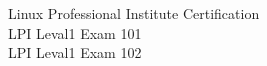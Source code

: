 \documentclass[8pt,b5paper]{jarticle}
\begin{document}
\thispagestyle{empty}
\begin{center}
	\vspace*{250truept}
	{\Large Linux Professional Institute Certification} \\
	\vspace*{20truept}
	{\Large LPI Leval1 Exam 101} \\
	\vspace*{10truept}
	{\Large LPI Leval1 Exam 102} \\
\end{center}

\newpage
\thispagestyle{empty}
~

\newpage
\tableofcontents

\newpage
\thispagestyle{empty}
~

\newpage

\end{document}
